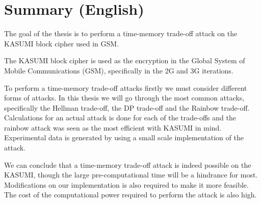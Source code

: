\chapter{Summary (English)}

The goal of the thesis is to perform a time-memory trade-off attack on
the KASUMI block cipher used in GSM.

The KASUMI block cipher is used as the encryption in the Global System
of Mobile Communications (GSM), specifically in the 2G and 3G
iterations. 

To perform a time-memory trade-off attacks firstly we must consider
different forms of attacks. In this thesis we will go through the most
common attacks, specifically the Hellman trade-off, the DP trade-off and
the Rainbow trade-off. Calculations for an actual attack is done for
each of the trade-offs and the rainbow attack was seen as the most
efficient with KASUMI in mind. Experimental data is generated by using
a small scale implementation of the attack.

We can conclude that a time-memory trade-off attack is indeed possible on the KASUMI,
though the large pre-computational time will be a hindrance for
most. Modifications on our implementation is also required to make it
more feasible. The cost of the computational power required to perform
the attack is also high.

